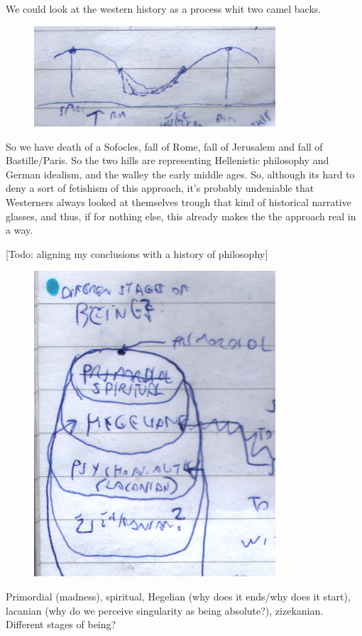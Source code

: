 \documentclass[10pt]{book}
\begin{document}
We could look at the western history as a process whit two camel backs. 
\begin{figure}[ht!]
\centering
\includegraphics[width=90mm]{scan11.jpg}
\label{overflow}
\end{figure}
So we have death of a Sofocles, fall of Rome, fall of Jerusalem and fall of Bastille/Paris. So the two hills are representing Hellenistic philosophy and German idealism, and the walley the early middle ages.
So, although its hard to deny a sort of fetishism of this approach, it's probably undeniable that Westerners always looked at themselves trough that kind of historical narrative glasses, and  thus, if for nothing else, this already makes the the approach real in a way.

[Todo: aligning my conclusions with a history of philosophy]

\begin{figure}[ht!]
\centering
\includegraphics[width=90mm]{scan13.jpg}
\label{overflow}
\end{figure}
Primordial (madness), spiritual, Hegelian (why does it ends/why does it start), lacanian (why do we perceive singularity as being absolute?), zizekanian. 
Different stages of being?
\end{document}
